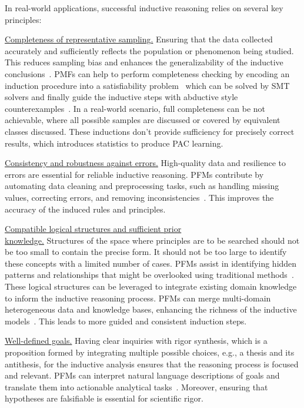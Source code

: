   
In real-world applications, successful inductive reasoning relies on several key principles:
  
\underline{Completeness of representative sampling.} Ensuring that the data collected accurately and sufficiently reflects the population or phenomenon being studied. This reduces sampling bias and enhances the generalizability of the inductive conclusions~\cite{037little2019statistical}. PMFs can help to perform completeness checking by encoding an induction procedure into a satisfiability problem~\cite{ye2024satlm} which can be solved by SMT solvers and finally guide the inductive steps with abductive style counterexamples~\cite{jha2023counterexample}. In a real-world scenario, full completeness can be not achievable, where all possible samples are discussed or covered by equivalent classes discussed. These inductions don't provide sufficiency for precisely correct results, which introduces statistics to produce PAC learning.
      
\underline{Consistency and robustness against errors.} High-quality data and resilience to errors are essential for reliable inductive reasoning. PFMs contribute by automating data cleaning and preprocessing tasks, such as handling missing values, correcting errors, and removing inconsistencies~\cite{ni2024iterclean, qi2024cleanagent}. This improves the accuracy of the induced rules and principles.
      
\underline{Compatible logical structures and sufficient prior} \\ \underline{knowledge.} Structures of the space where principles are to be searched should not be too small to contain the precise form. It should not be too large to identify these concepts with a limited number of cases. PFMs assist in identifying hidden patterns and relationships that might be overlooked using traditional methods~\cite{ma2023insightpilot, Dibia2023LIDAAT}. These logical structures can be leveraged to integrate existing domain knowledge to inform the inductive reasoning process. PFMs can merge multi-domain heterogeneous data and knowledge bases, enhancing the richness of the inductive models~\cite{Ellis2020DreamCoderGG, Tang2024WorldCoderAM}. This leads to more guided and consistent induction steps.
      
\underline{Well-defined goals.} Having clear inquiries with rigor synthesis, which is a proposition formed by integrating multiple possible choices, e.g., a thesis and its antithesis, for the inductive analysis ensures that the reasoning process is focused and relevant. PFMs can interpret natural language descriptions of goals and translate them into actionable analytical tasks~\cite{li2023resdsql, gu2023few}. Moreover, ensuring that hypotheses are falsifiable is essential for scientific rigor.
  
